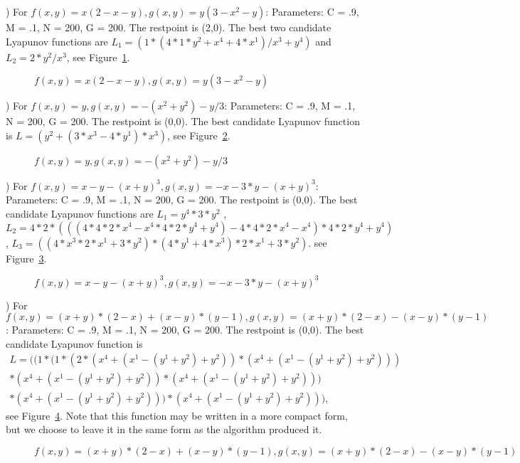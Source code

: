 \documentclass[12pt]{article}
\begin{document}
) For {\color{ExampleDarkBlue}$f(x,y) = x(2-x-y), g(x,y) = y(3-x^2-y)$}: 
Parameters:  
C = .9, M = .1, N = 200, G = 200. The restpoint is (2,0).
The best two candidate Lyapunov functions are 
$L_1 = (1*(4*1*y^2+x^4+4*x^1)/x^3+y^4)$ and $L_2 = 2*y^2/x^3$, 
see Figure~\ref{one}.
\begin{figure}[tbh]
\caption{\label{one}$f(x,y) = x(2-x-y), g(x,y) = y(3-x^2-y)$}
\end{figure}

) For {\color{ExampleDarkBlue}$f(x,y) = y, g(x,y) = -(x^2+y^2)-y/3$}:
Parameters: C = .9, M = .1, N = 200, G = 200. The restpoint is (0,0).
The best candidate Lyapunov function is
$L = (y^2+(3*x^3-4*y^1)*x^3)$, see Figure~\ref{two}.
\begin{figure}[thb]
\caption{\label{two}$f(x,y) = y, g(x,y) = -(x^2+y^2)-y/3$}
\end{figure}

) For {\color{ExampleDarkBlue}$f(x,y) = x-y-(x+y)^3, g(x,y) = -x-3*y-(x+y)^3$}:
Parameters:  
C = .9, M = .1, N = 200, G = 200.  The restpoint is (0,0).
The best candidate Lyapunov functions are
$L_1 = y^4*3*y^2$ ,
$L_2 = 4*2*(((4*4*2*x^4-x^4*4*2*y^4+y^4)-4*4*2*x^4-x^4)*4*2*y^4+y^4)$,
$L_3 = ((4*x^3*2*x^1+3*y^2)*(4*y^1+4*x^3)*2*x^1+3*y^2)$. see Figure~\ref{three}.
\begin{figure}[tbh]
\caption{\label{three}$f(x,y) = x-y-(x+y)^3, g(x,y) = -x-3*y-(x+y)^3$}
\end{figure}

) For {\color{ExampleDarkBlue}$f(x,y) = (x+y)*(2-x)+(x-y)*(y-1), g(x,y) = (x+y)*(2-x)-(x-y)*(y-1)$}:
Parameters:  C = .9, M = .1, N = 200, G = 200.   The restpoint is (0,0).
The best candidate Lyapunov function is
$$
\begin{array}{l}
L= ((1*(1*(2*(x^4+(x^1-(y^1+y^2)+y^2))*(x^4+(x^1-(y^1+y^2)+y^2)))\\
*(x^4+(x^1-(y^1+y^2)+y^2))*(x^4+(x^1-(y^1+y^2)+y^2)))\\
*(x^4+(x^1-(y^1+y^2)+y^2)))*(x^4+(x^1-(y^1+y^2)+y^2))),\end{array}$$
see Figure~\ref{four}.  Note that this function may be written in a
more compact form, but we choose to leave it in the same form as the
algorithm produced it.
\begin{figure}[tbh]
\caption{\label{four}$f(x,y) = (x+y)*(2-x)+(x-y)*(y-1), g(x,y) = (x+y)*(2-x)-(x-y)*(y-1)$}
\end{figure}
\end{document}
